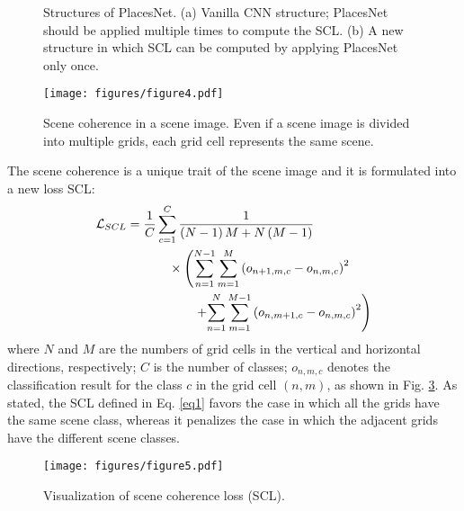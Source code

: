 \documentclass[journal,comsoc]{IEEEtran}
\begin{document}
\begin{figure}[!t]
\centering
{}

\caption{Structures of PlacesNet. (a) Vanilla CNN structure; PlacesNet should be applied multiple times to compute the SCL. (b) A new structure in which SCL can be computed by applying PlacesNet only once.}
\label{fig3}
\end{figure}


\begin{figure}[!t]
\centering
\texttt{[image: figures/figure4.pdf]}
\caption{Scene coherence in a scene image. Even if a scene image is divided into multiple grids, each grid cell represents the same scene.}
\label{fig4}
\end{figure}

The scene coherence is a unique trait of the scene image and it is formulated into a new loss SCL:
\begin{equation}
\begin{aligned}
{{\cal L}_{SCL}} = {} & \frac{1}{C}\sum\limits_{c = 1}^C {\frac{1}{{\left( {N - 1} \right)M + N\left( {M - 1} \right)}}} \\
& \qquad \times \left( {\sum\limits_{n = 1}^{N - 1} {\sum\limits_{m = 1}^M {{{\left( {{o_{n + 1,m,c}} - {o_{n,m,c}}} \right)}^2}} }} \right. \\
& \qquad \qquad \left. + {\sum\limits_{n = 1}^N {\sum\limits_{m = 1}^{M - 1} {{{\left( {{o_{n,m + 1,c}} - {o_{n,m,c}}} \right)}^2}} } } \right)
\label{eq1}
\end{aligned}
\end{equation}
where $N$ and $M$ are the numbers of grid cells in the vertical and horizontal directions, respectively; $C$ is the number of classes; ${o_{n,m,c}}$ denotes the classification result for the class $c$ in the grid cell $\left( n,m \right)$, as shown in Fig. \ref{fig5}. As stated, the SCL defined in Eq. \ref{eq1} favors the case in which all the grids have the same scene class, whereas it penalizes the case in which the adjacent grids have the different scene classes.


\begin{figure}[!t]
\centering
\texttt{[image: figures/figure5.pdf]}
\caption{Visualization of scene coherence loss (SCL).}
\label{fig5}
\end{figure}
\end{document}
